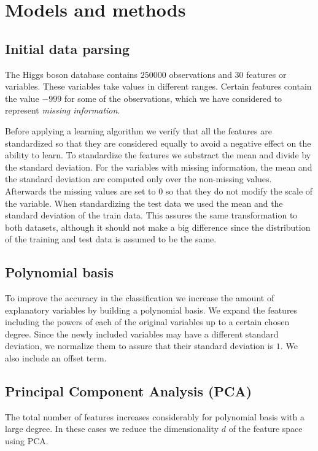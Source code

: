 \documentclass[10pt,conference,compsocconf]{IEEEtran}
\begin{document}
\section{Models and methods}
	\label{sec:models-methods}
	\subsection{Initial data parsing} %
	\label{sub:initial_data_parsing}
  	The Higgs boson database contains $250000$ observations and $30$ features or variables. These variables take values in different ranges. Certain features contain the value $-999$ for some of the observations, which we have considered to represent \emph{missing information}. %

  	Before applying a learning algorithm we verify that all the features are standardized so that they are considered equally to avoid a negative effect on the ability to learn. To standardize the features we substract the mean and divide by the standard deviation. For the variables with missing information, the mean and the standard deviation are computed only over the non-missing values. Afterwards the missing values are set to $0$ so that they do not modify the scale of the variable. When standardizing the test data we used the mean and the standard deviation of the train data. This assures the same transformation to both datasets, although it should not make a big difference since the distribution of the training and test data is assumed to be the same.

	\subsection{Polynomial basis} %
	\label{sub:polynomial_basis}
  	To improve the accuracy in the classification we increase the amount of explanatory variables by building a polynomial basis. We expand the features including the powers of each of the original variables up to a certain chosen degree. Since the newly included variables may have a different standard deviation, we normalize them to assure that their standard deviation is $1$. We also include an offset term.

	\subsection{Principal Component Analysis (PCA)} %
	\label{sub:principal_component_analysis}
  	The total number of features increases considerably for polynomial basis with a large degree. In these cases we reduce the dimensionality $d$ of the feature space using PCA.
\end{document}
